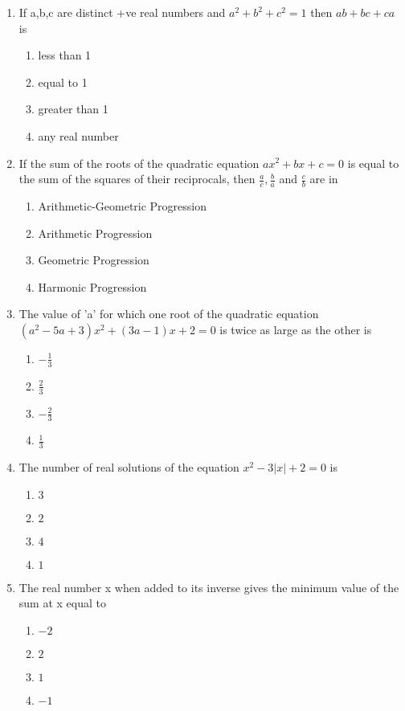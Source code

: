 \begin{enumerate}[label=\arabic*.,ref=\thesubsection.\theenumi]
\item If a,b,c are distinct +ve real numbers and $a^2+b^2+c^2=1$ then $ab+bc+ca$ is
\begin{enumerate}
\item less than 1
\item equal to 1 
\item greater than 1
\item any real number 
\end{enumerate}

\item If the sum of the roots of the quadratic equation $ax^2+bx+c=0$ is equal to the sum of the squares of their reciprocals, then $\frac{a}{c},\frac{b}{a}$ and $\frac{c}{b}$ are in
\begin{enumerate}
\item Arithmetic-Geometric Progression
\item Arithmetic Progression 
\item Geometric Progression
\item Harmonic Progression
\end{enumerate}

\item The value of 'a' for which one root of the quadratic equation $(a^2-5a+3)x^2+(3a-1)x+2=0$ is twice as large as the other is
\begin{enumerate}
\item $-\frac{1}{3}$
\item $\frac{2}{3}$
\item $-\frac{2}{3}$
\item $\frac{1}{3}$
\end{enumerate}

\item The number of real solutions of the equation $x^2-3|x|+2=0$ is
\begin{enumerate}
\item $3$
\item $2$ 
\item $4$
\item $1$
\end{enumerate}

\item The real number x when added to its inverse gives the minimum value of the sum at x equal to
\begin{enumerate}
\item $-2$
\item $2$ 
\item $1$
\item $-1$ 
\end{enumerate}


\end{enumerate}
